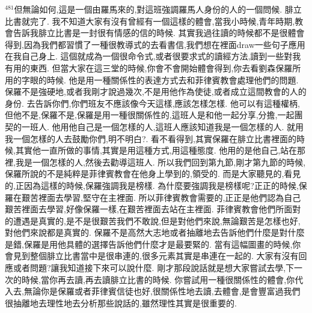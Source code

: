 \documentclass{book}
\begin{document}
$^{481}$但無論如何,這是一個由羅馬來的,對這班強調羅馬人身份的人的一個問候.
腓立比書就完了.
我不知道大家有沒有曾經有一個這樣的體會,當我小時候,青年時期,教會告訴我腓立比書是一封很有情感的信的時候.
其實我過往讀的時候都不是很體會得到,因為我們都習慣了一種很教導式的去看書信,我們想在裡面draw一些句子應用在我自己身上.
這個就成為一個很命令式,或者很要求式的讀經方法,讀到一些對我有用的東西.
但當大家在這三堂的時候,你會不會開始體會得到,你去看劉森保羅所用的字眼的時候.
他是用一種關係性的表達方式去和菲律賓教會處理他們的問題.
保羅不是強硬地,或者我剛才說過幾次,不是用他作為使徒,或者成立這間教會的人的身份.
去告訴你們,你們班友不應該像今天這樣,應該怎樣怎樣.
他可以有這種權柄,但他不是,保羅不是,保羅是用一種很關係性的,這班人是和他一起分享,分擔,一起團契的一班人.
他用他自己是一個怎樣的人,這班人應該知道我是一個怎樣的人.
就用我一個怎樣的人去鼓勵你們,明不明白?.
看不看得到,其實保羅在腓立比書裡面的時候,其實他一直所做的事情,其實是用這種方式,用這種態度.
他用的是他自己,站在那裡,我是一個怎樣的人,然後去勸導這班人.
所以我們回到第九節,剛才第九節的時候,保羅所說的不是純粹是菲律賓教會在他身上學到的,領受的.
而是大家聽見的,看見的,正因為這樣的時候,保羅強調我是榜樣.
為什麼要強調我是榜樣呢?正正的時候,保羅在艱苦裡面去學習,堅守在主裡面.
所以菲律賓教會需要的,正正是他們認為自己艱苦裡面去學習,好像保羅一樣,在艱苦裡面去站在主裡面.
菲律賓教會他們所面對的遭遇是真實的,是不是很艱苦我們不敢說,但是對他們來說,無論艱苦是怎樣也好,對他們來說都是真實的.
保羅不是高然大志地或者抽離地去告訴他們什麼是對什麼是錯,保羅是用他具體的選擇告訴他們什麼才是最要緊的.
當有這幅圖畫的時候,你會見到整個腓立比書當中是很串連的,很多元素其實是串連在一起的.
大家有沒有回應或者問題?讓我知道接下來可以說什麼.
剛才那段說話就是想大家嘗試去學,下一次的時候,當你再去讀,再去讀腓立比書的時候.
你嘗試用一種很關係性的體會,你代入去,無論你是保羅或者菲律賓信徒也好,很關係性地去讀,去體會,是會豐富過我們很抽離地去理性地去分析那些說話的,雖然理性其實是很重要的.
\newpage
\end{document}
